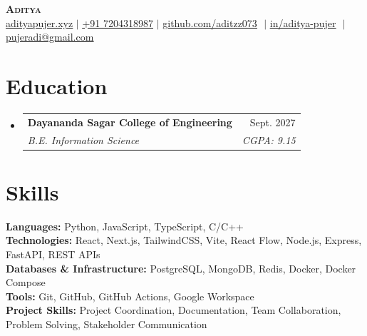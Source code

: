 \documentclass[letterpaper,11pt]{article}
\makeatletter
\newcommand{\resumeSubheading}[4]{
  \vspace{-2pt}\item
    \begin{tabular*}{0.97\textwidth}[t]{l@{\extracolsep{\fill}}r}
      \textbf{#1} & #2 \\
      \textit{\small#3} & \textit{\small #4} \\
    \end{tabular*}\vspace{-7pt}
}
\newcommand{\resumeSubHeadingListStart}{\begin{itemize}[leftmargin=0.15in, label={}]}
\newcommand{\resumeSubHeadingListEnd}{\end{itemize}}
\makeatother
\begin{document}
\begin{flushright}
  \color{gray}
  \item
\end{flushright}

\vspace{-16.5pt}

\begin{center}
    \textbf{\Huge \scshape Aditya} \\ \vspace{8pt}
    \small 
    \href{https://www.adityapujer.xyz}
    {\underline{adityapujer.xyz}}
    $ | $
    \href{tel:+917204328987}
    {\underline{+91 7204318987}}
    $ | $
    \href{https://github.com/aditzz073}{\underline{github.com/aditzz073}} $  $
    $ | $
    \href{https://linkedin.com/in/aditya-pujer}{\underline{in/aditya-pujer}} $  $
    $ | $
    \href{mailto:pujeradi@gmail.com}
    {\underline{pujeradi@gmail.com}}
    
\end{center}

\section{Education}
  \resumeSubHeadingListStart
  
    \resumeSubheading
      {Dayananda Sagar College of Engineering}{Sept. 2027}
      {B.E. Information Science}{CGPA: 9.15}
  \resumeSubHeadingListEnd

\section{Skills}

\begin{itemize}[leftmargin=0.15in,label={}]

\small{\item{

\textbf{Languages:} Python, JavaScript, TypeScript, C/C++ \\

\textbf{Technologies:} React, Next.js, TailwindCSS, Vite, React Flow, Node.js, Express, FastAPI, REST APIs \\

\textbf{Databases \& Infrastructure:} PostgreSQL, MongoDB, Redis, Docker, Docker Compose \\

\textbf{Tools:} Git, GitHub, GitHub Actions, Google Workspace \\

\textbf{Project Skills:} Project Coordination, Documentation, Team Collaboration, Problem Solving, Stakeholder Communication \\
}}

\end{itemize}
\end{document}
